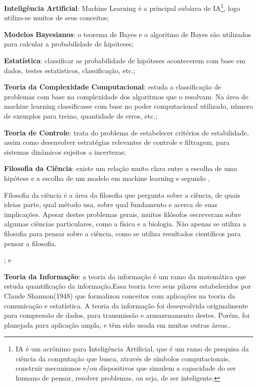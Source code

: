  \begin{alineas}
	\item \textbf{Inteligência Artificial}: Machine Learning é a principal subárea de IA\footnote{IA é um acrônimo para Inteligência Artificial,
	 que é um ramo de pesquisa da ciência da computação que busca, através de símbolos computacionais, construir mecanismos 
	 e/ou dispositivos que simulem a capacidade do ser humano de pensar, resolver problemas, ou seja, de ser inteligente.\cite{IA_Web}},
	 logo utiliza-se muitos de seus conceitos;  
	
	
	\item \textbf{Modelos Bayesianos}: o teorema de Bayes e o algoritmo de Bayes são utilizados para calcular a probabilidade de hipóteses;
	
	
	\item \textbf{Estatística}: classificar as probabilidade de hipóteses acontecerem com base em dados, testes estatisticos, classificação, etc.;
	
	
	\item \textbf{Teoria da Complexidade Computacional}: estuda a classificação de problemas com base na complexidade dos algoritmos que
	o resolvam. Na área de machine learning classificasse com base no poder computacional utilizado, número de exemplos para treino, quantidade de erros, etc.;   
	
	
	\item \textbf{Teoria de Controle}: trata do problema de estabelecer critérios de estabilidade, assim como desenvolver estratégias 
	relevantes de controle e filtragem, para sistemas dinâmicos sujeitos a incertezas;
	
	
	\item \textbf{Filosofia da Ciência}: existe um relação muito clara entre a escolha de uma hipótese e a escolha de um modelo em machine learning 
	e segundo \cite{FilosofiaCiencia}, 	
	\begin{citacao} 
		Filosofia da ciência é a área da filosofia que pergunta sobre a ciência, de quais ideias parte, qual método usa, sobre qual fundamento e 
		acerca de suas implicações. Apesar destes problemas gerais, muitos filósofos escreveram sobre algumas ciências particulares, 
		como a física e a biologia. Não apenas se utiliza a filosofia para pensar sobre a ciência, 
		como se utiliza resultados científicos para pensar a filosofia.
	\end{citacao} 
	; e
	
	
	\item \textbf{Teoria da Informação}: a teoria da informação é um ramo da matemática que estuda quantificação da informação.Essa teoria teve seus 
	pilares estabelecidos por Claude Shannon(1948) que formalizou conceitos com aplicações na teoria da comunicação e estatística. 
	A teoria da informação foi desenvolvida originalmente para compressão de dados, para transmissão e armazenamento destes. 
	Porém, foi planejada para aplicação ampla, e têm sido usada em muitas outras áreas.\cite{TeoriaInformacao}.	
\end{alineas}

